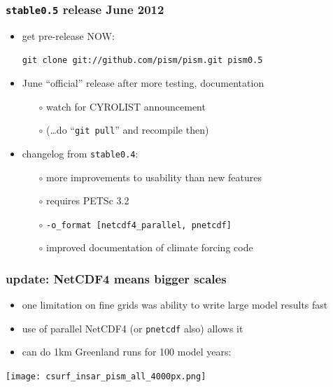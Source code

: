 \documentclass[hide notes,intlimits]{beamer}
\begin{document}
\begin{frame}
  \frametitle{\texttt{stable0.5} release June 2012}

  \begin{itemize}
  \item get pre-release \alert{NOW}:
    \begin{center}
    \texttt{git clone git://github.com/pism/pism.git pism0.5}
    \end{center}
  \item June ``official'' release after more testing, documentation
    \begin{itemize}
    \item[$\circ$] watch for CYROLIST announcement
    \item[$\circ$] (\dots do ``\texttt{git pull}'' and recompile then)
    \end{itemize}
  \item changelog from \texttt{stable0.4}:
    \begin{itemize}
    \item[$\circ$] more improvements to usability than new features
    \item[$\circ$] requires PETSc 3.2
    \item[$\circ$] \texttt{-o\_format [netcdf4\_parallel, pnetcdf]}
    \item[$\circ$] improved documentation of climate forcing code
    \end{itemize}
  \end{itemize}
\end{frame}


\begin{frame}
  \frametitle{update: NetCDF4 means bigger scales}

  \begin{itemize}
  \item one limitation on fine grids was ability to write large model results fast
  \item use of parallel NetCDF4 (or \texttt{pnetcdf} also) allows it
  \item can do 1km Greenland runs for 100 model years:
  \end{itemize}
  
    \vspace{-2mm}
    \begin{center}
    \texttt{[image: csurf\_insar\_pism\_all\_4000px.png]}
    \end{center}
\end{frame}
\end{document}
